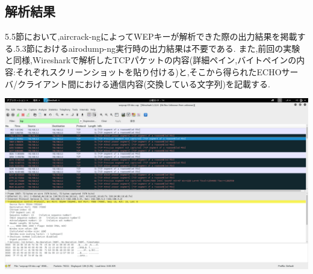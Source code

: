 \documentclass[a4j]{celb-report}
\begin{document}
\subsection{解析結果}
5.5節において,aircrack-ngによってWEPキーが解析できた際の出力結果を掲載する.5.3節におけるairodump-ng実行時の出力結果は不要である.
また,前回の実験と同様,Wiresharkで解析したTCPパケットの内容(詳細ペイン,バイトペインの内容:それぞれスクリーンショットを貼り付ける)と,そこから得られたECHOサーバ/クライアント間における通信内容(交換している文字列)を記載する.

\begin{center}
 \includegraphics[width=17cm]{../LAN2/screenshot.png}
\end{center}
\end{document}

